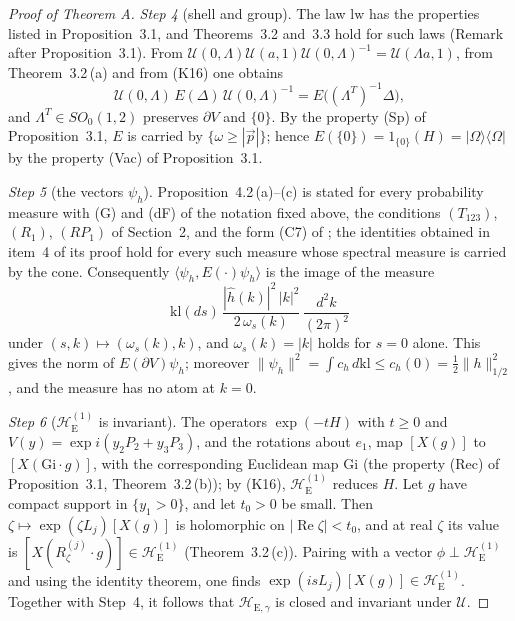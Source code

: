 \documentclass[11pt]{amsart}
\theoremstyle{definition}
\begin{document}
\begin{proof}[Proof of Theorem A]
\emph{Step 4} (shell and group).
The law $\mathrm{lw}$ has the properties listed in Proposition~3.1, and Theorems~3.2 and~3.3 hold for such laws (Remark after Proposition~3.1).
From $\mathcal U(0,\allowbreak \Lambda)\mathcal U(a,\allowbreak 1)\mathcal U(0,\allowbreak \Lambda)^{-1}=\allowbreak \mathcal U(\Lambda a,\allowbreak 1)$, from Theorem~3.2\,(a) and from (K16) one obtains
\begin{equation*}
\mathcal U(0,\Lambda)\,E(\Delta)\,\mathcal U(0,\Lambda)^{-1}=E\bigl((\Lambda^T)^{-1}\Delta\bigr),
\end{equation*}
and $\Lambda^T\in SO_0(1,2)$ preserves $\partial V$ and $\{0\}$.
By the property (Sp) of Proposition~3.1, $E$ is carried by $\{\omega\ge|\vec p|\}$;
hence $E(\{0\})=1_{\{0\}}(H)=|\Omega\rangle\langle\Omega|$ by the property (Vac) of Proposition~3.1.

\emph{Step 5} (the vectors $\psi_h$).
Proposition~4.2\,(a)--(c) is stated for every probability measure with (G) and (dF) of the notation fixed above, the conditions $(T_{123})$, $(R_1)$, $(RP_1)$ of Section~2, and the form (C7) of \cite[Theorem~44]{QEDIII};
the identities obtained in item~4 of its proof hold for every such measure whose spectral measure is carried by the cone.
Consequently $\langle\psi_h,E(\cdot)\psi_h\rangle$ is the image of the measure
\begin{equation*}
\mathrm{kl}(ds)\,\frac{|\hat h(k)|^2\,|k|^2}{2\,\omega_s(k)}\,\frac{d^2k}{(2\pi)^2}
\end{equation*}
under $(s,k)\mapsto(\omega_s(k),k)$, and $\omega_s(k)=|k|$ holds for $s=0$ alone.
This gives the norm of $E(\partial V)\psi_h$;
moreover $\|\psi_h\|^2=\allowbreak \int c_h\,\allowbreak d\mathrm{kl}\le c_h(0)=\allowbreak \frac12\|h\|_{1/2}^2$, and the measure has no atom at $k=0$.

\emph{Step 6} ($\mathcal H_{\mathrm E}^{(1)}$ is invariant).
The operators $\exp(-tH)$ with $t\ge0$ and $V(y)=\exp i(y_2P_2+y_3P_3)$, and the rotations about $e_1$, map $[X(g)]$ to $[X(\mathrm{Gi}\cdot g)]$, with the corresponding Euclidean map $\mathrm{Gi}$ (the property (Rec) of Proposition~3.1, Theorem~3.2\,(b));
by (K16), $\mathcal H_{\mathrm E}^{(1)}$ reduces $H$.
Let $g$ have compact support in $\{y_1>0\}$, and let $t_0>0$ be small.
Then $\zeta\mapsto\exp(\zeta L_j)[X(g)]$ is holomorphic on $|\operatorname{Re}\zeta|<t_0$, and at real $\zeta$ its value is $[X(R^{(j)}_\zeta\cdot g)]\in\mathcal H_{\mathrm E}^{(1)}$ (Theorem~3.2\,(c)).
Pairing with a vector $\phi\perp\mathcal H_{\mathrm E}^{(1)}$ and using the identity theorem, one finds $\exp(isL_j)[X(g)]\in\mathcal H_{\mathrm E}^{(1)}$.
Together with Step~4, it follows that $\mathcal H_{\mathrm E,\gamma}$ is closed and invariant under $\mathcal U$.


\end{proof}
\end{document}

